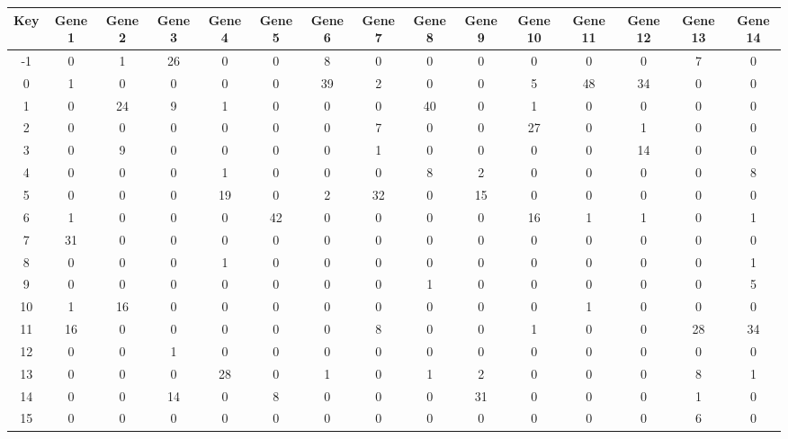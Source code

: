 \begin{tabular}{|c|c|c|c|c|c|c|c|c|c|c|c|c|c|c|}
\hline
Key & Gene 1 & Gene 2 & Gene 3 & Gene 4 & Gene 5 & Gene 6 & Gene 7 & Gene 8 & Gene 9 & Gene 10 & Gene 11 & Gene 12 & Gene 13 & Gene 14 \\
\hline
-1 & 0 & 1 & 26 & 0 & 0 & 8 & 0 & 0 & 0 & 0 & 0 & 0 & 7 & 0 \\
0 & 1 & 0 & 0 & 0 & 0 & 39 & 2 & 0 & 0 & 5 & 48 & 34 & 0 & 0 \\
1 & 0 & 24 & 9 & 1 & 0 & 0 & 0 & 40 & 0 & 1 & 0 & 0 & 0 & 0 \\
2 & 0 & 0 & 0 & 0 & 0 & 0 & 7 & 0 & 0 & 27 & 0 & 1 & 0 & 0 \\
3 & 0 & 9 & 0 & 0 & 0 & 0 & 1 & 0 & 0 & 0 & 0 & 14 & 0 & 0 \\
4 & 0 & 0 & 0 & 1 & 0 & 0 & 0 & 8 & 2 & 0 & 0 & 0 & 0 & 8 \\
5 & 0 & 0 & 0 & 19 & 0 & 2 & 32 & 0 & 15 & 0 & 0 & 0 & 0 & 0 \\
6 & 1 & 0 & 0 & 0 & 42 & 0 & 0 & 0 & 0 & 16 & 1 & 1 & 0 & 1 \\
7 & 31 & 0 & 0 & 0 & 0 & 0 & 0 & 0 & 0 & 0 & 0 & 0 & 0 & 0 \\
8 & 0 & 0 & 0 & 1 & 0 & 0 & 0 & 0 & 0 & 0 & 0 & 0 & 0 & 1 \\
9 & 0 & 0 & 0 & 0 & 0 & 0 & 0 & 1 & 0 & 0 & 0 & 0 & 0 & 5 \\
10 & 1 & 16 & 0 & 0 & 0 & 0 & 0 & 0 & 0 & 0 & 1 & 0 & 0 & 0 \\
11 & 16 & 0 & 0 & 0 & 0 & 0 & 8 & 0 & 0 & 1 & 0 & 0 & 28 & 34 \\
12 & 0 & 0 & 1 & 0 & 0 & 0 & 0 & 0 & 0 & 0 & 0 & 0 & 0 & 0 \\
13 & 0 & 0 & 0 & 28 & 0 & 1 & 0 & 1 & 2 & 0 & 0 & 0 & 8 & 1 \\
14 & 0 & 0 & 14 & 0 & 8 & 0 & 0 & 0 & 31 & 0 & 0 & 0 & 1 & 0 \\
15 & 0 & 0 & 0 & 0 & 0 & 0 & 0 & 0 & 0 & 0 & 0 & 0 & 6 & 0 \\
\hline
\end{tabular}